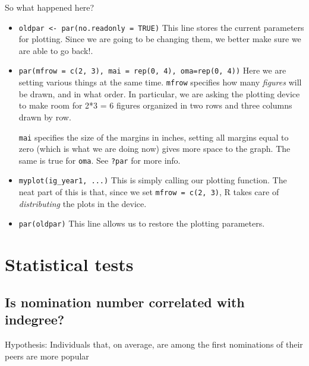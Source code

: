 \documentclass[
]{book}
\begin{document}
So what happened here?

\begin{itemize}
\item
  \texttt{oldpar\ \textless{}-\ par(no.readonly\ =\ TRUE)} This line stores the current parameters for plotting. Since we are going to be changing them, we better make sure we are able to go back!.
\item
  \texttt{par(mfrow\ =\ c(2,\ 3),\ mai\ =\ rep(0,\ 4),\ oma=rep(0,\ 4))} Here we are setting various things at the same time. \texttt{mfrow} specifies how many \emph{figures} will be drawn, and in what order. In particular, we are asking the plotting device to make room for 2*3 = 6 figures organized in two rows and three columns drawn by row.

  \texttt{mai} specifies the size of the margins in inches, setting all margins equal to zero (which is what we are doing now) gives more space to the graph. The same is true for \texttt{oma}. See \texttt{?par} for more info.
\item
  \texttt{myplot(ig\_year1,\ ...)} This is simply calling our plotting function. The neat part of this is that, since we set \texttt{mfrow\ =\ c(2,\ 3)}, R takes care of \emph{distributing} the plots in the device.
\item
  \texttt{par(oldpar)} This line allows us to restore the plotting parameters.
\end{itemize}

\hypertarget{statistical-tests}{%
\section{Statistical tests}\label{statistical-tests}}

\hypertarget{is-nomination-number-correlated-with-indegree}{%
\subsection{Is nomination number correlated with indegree?}\label{is-nomination-number-correlated-with-indegree}}

Hypothesis: Individuals that, on average, are among the first nominations of their peers are more popular
\end{document}
